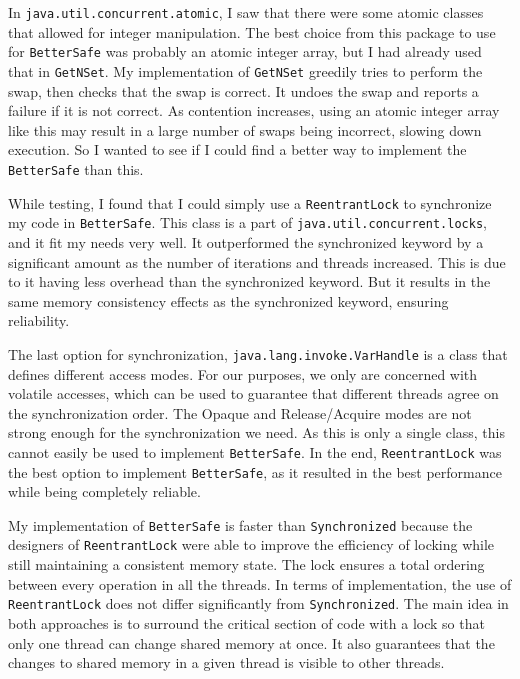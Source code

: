 \documentclass[letterpaper,twocolumn,10pt]{article}
\begin{document}
In \texttt{java.util.concurrent.atomic}, I saw that there were some atomic classes that allowed for integer manipulation. The best choice from this package to use for
\texttt{BetterSafe} was probably an atomic integer array, but I had already used that in \texttt{GetNSet}. My implementation of \texttt{GetNSet} greedily tries to perform
the swap, then checks that the swap is correct. It undoes the swap and reports a failure if it is not correct. As contention increases, using an atomic integer array like this
may result in a large number of swaps being incorrect, slowing down execution. So I wanted to see if I could find a better way to implement the \texttt{BetterSafe} than this.

While testing, I found that I could simply use a \texttt{ReentrantLock} to synchronize my code in \texttt{BetterSafe}. This class is a part of \texttt{java.util.concurrent.locks},
and it fit my needs very well. It outperformed the synchronized keyword by a significant amount as the number of iterations and threads increased. This is due to it having less
overhead than the synchronized keyword. But it results in the same memory consistency effects as the synchronized keyword, ensuring reliability.

The last option for synchronization, \texttt{java.lang.invoke.VarHandle} is a class that defines different access modes. For our purposes, we only are concerned with volatile
accesses, which can be used to guarantee that different threads agree on the synchronization order. The Opaque and Release/Acquire modes are not strong enough for the
synchronization we need. As this is only a single class, this cannot easily be used to implement \texttt{BetterSafe}. In the end, \texttt{ReentrantLock} was the best option
to implement \texttt{BetterSafe}, as it resulted in the best performance while being completely reliable.

My implementation of \texttt{BetterSafe} is faster than \texttt{Synchronized} because the designers of \texttt{ReentrantLock} were able to improve the efficiency of
locking while still maintaining a consistent memory state. The lock ensures a total ordering between every operation in all the threads. In terms of implementation, the use of
\texttt{ReentrantLock} does not differ significantly from \texttt{Synchronized}. The main idea in both approaches is to surround the critical section of code with a lock so that
only one thread can change shared memory at once. It also guarantees that the changes to shared memory in a given thread is visible to other threads.
\end{document}
